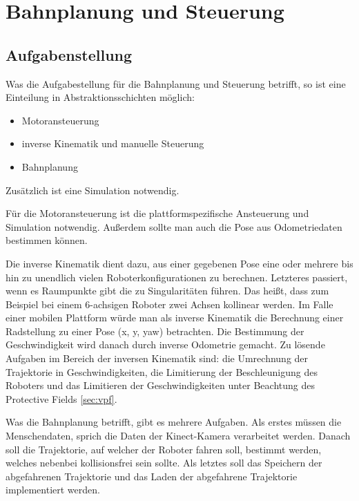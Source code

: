 \chapter{Bahnplanung und Steuerung}
\label{bahnplanung_steuerung_cha}

\section{Aufgabenstellung}
\label{bahnplanung_aufgabenstellung_sec}
\authorsection{\editoroier}


Was die Aufgabestellung für die Bahnplanung und Steuerung betrifft, so ist eine Einteilung in Abstraktionsschichten möglich:
\begin{itemize}
	\item Motoransteuerung
	\item inverse Kinematik und manuelle Steuerung
	\item Bahnplanung	
\end{itemize}
Zusätzlich ist eine Simulation notwendig.

Für die Motoransteuerung ist die plattformspezifische Ansteuerung und Simulation notwendig. Außerdem sollte man auch die Pose aus Odometriedaten bestimmen können.

Die inverse Kinematik dient dazu, aus einer gegebenen Pose eine oder mehrere bis hin zu unendlich vielen Roboterkonfigurationen zu berechnen. Letzteres passiert, wenn es Raumpunkte gibt die zu Singularitäten führen. Das heißt, dass zum Beispiel bei einem 6-achsigen Roboter zwei Achsen kollinear werden. Im Falle einer mobilen Plattform würde man als inverse Kinematik die Berechnung einer Radstellung zu einer Pose (x, y, yaw) betrachten. Die Bestimmung der Geschwindigkeit wird danach durch inverse Odometrie gemacht. Zu lösende Aufgaben im Bereich der inversen Kinematik sind: die Umrechnung der Trajektorie in Geschwindigkeiten, die Limitierung der Beschleunigung des Roboters und das Limitieren der Geschwindigkeiten unter Beachtung des Protective Fields \ref{sec:vpf}.

Was die Bahnplanung betrifft, gibt es mehrere Aufgaben. Als erstes müssen die Menschendaten, sprich die Daten der Kinect-Kamera verarbeitet werden. 
Danach soll die Trajektorie, auf welcher der Roboter fahren soll, bestimmt werden, welches nebenbei kollisionsfrei sein sollte. Als letztes soll das 
Speichern der abgefahrenen Trajektorie und das Laden der abgefahrene Trajektorie implementiert werden.



